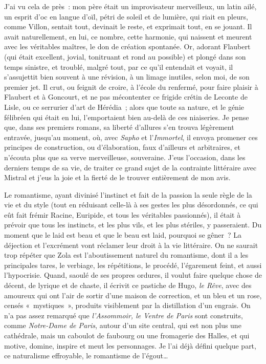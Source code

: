 \documentclass[french,twoside]{book} %
\begin{document}
J’ai vu cela de près : mon père était un improvisateur merveilleux, un latin ailé, un esprit d’oc en langue d’oïl, pétri de soleil et de lumière, qui riait en pleurs, comme Villon, sentait tout, devinait le reste, et exprimait tout, en se jouant. Il avait naturellement, en lui, ce nombre, cette harmonie, qui naissent et meurent avec les véritables maîtres, le don de création spontanée. Or, adorant Flaubert (qui était excellent, jovial, tonitruant et rond au possible) et plongé dans son temps sinistre, et troublé, malgré tout, par ce qu’il entendait et voyait, il s’assujettit bien souvent à une révision, à un limage inutiles, selon moi, de son premier jet. Il crut, ou feignit de croire, à l’école du renfermé, pour faire plaisir à Flaubert et à Goncourt, et ne pas mécontenter ce frigide crétin de Leconte de Lisle, ou ce serrurier d’art de Hérédia ; alors que toute sa nature, et le génie félibréen qui était en lui, l’emportaient bien au-delà de ces niaiseries. Je pense que, dans ses premiers romans, sa liberté d’allures s’en trouva légèrement entravée, jusqu’au moment, où, avec {\itshape Sapho} et l’{\itshape Immortel}, il envoya promener ces principes de construction, ou d’élaboration, faux d’ailleurs et arbitraires, et n’écouta plus que sa verve merveilleuse, souveraine. J’eus l’occasion, dans les derniers temps de sa vie, de traiter ce grand sujet de la contrainte littéraire avec Mistral et j’eus la joie et la fierté de le trouver entièrement de mon avis.\par
Le romantisme, ayant divinisé l’instinct et fait de la passion la seule règle de la vie et du style (tout en réduisant celle-là à ses gestes les plus désordonnés, ce qui eût fait frémir Racine, Euripide, et tous les véritables passionnés), il était à prévoir que tous les instincts, et les plus vils, et les plus stériles, y passeraient. Du moment que le laid est beau et que le beau est laid, pourquoi se gêner ? La déjection et l’excrément vont réclamer leur droit à la vie littéraire. On ne saurait trop répéter que Zola est l’aboutissement naturel du romantisme, dont il a les principales tares, le verbiage, les répétitions, le procédé, l’égarement feint, et aussi l’hypocrisie. Quand, saoulé de ses propres ordures, il voulut faire quelque chose de décent, de lyrique et de chaste, il écrivit ce pastiche de Hugo, {\itshape le Rêve}, avec des amoureux qui ont l’air de sortir d’une maison de correction, et un bleu et un rose, censés « mystiques », produits visiblement par la distillation d’un engrais. On n’a pas assez remarqué que {\itshape l’Assommoir, le Ventre de Paris} sont construits, comme {\itshape Notre-Dame de Paris}, autour d’un site central, qui est non plus une cathédrale, mais un caboulot de faubourg ou une fromagerie des Halles, et qui motive, domine, inspire et meut les personnages. Je l’ai déjà défini quelque part, ce naturalisme effroyable, le romantisme de l’égout…\par
\end{document}
